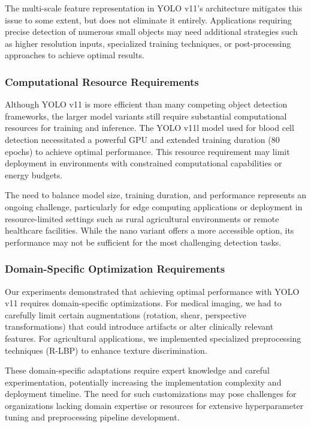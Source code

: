 \begin{multicols}{2}
The multi-scale feature representation in YOLO v11's architecture mitigates this issue to some extent, but does not eliminate it entirely. Applications requiring precise detection of numerous small objects may need additional strategies such as higher resolution inputs, specialized training techniques, or post-processing approaches to achieve optimal results.

\subsubsection{Computational Resource Requirements}
Although YOLO v11 is more efficient than many competing object detection frameworks, the larger model variants still require substantial computational resources for training and inference. The YOLO v11l model used for blood cell detection necessitated a powerful GPU and extended training duration (80 epochs) to achieve optimal performance. This resource requirement may limit deployment in environments with constrained computational capabilities or energy budgets.

The need to balance model size, training duration, and performance represents an ongoing challenge, particularly for edge computing applications or deployment in resource-limited settings such as rural agricultural environments or remote healthcare facilities. While the nano variant offers a more accessible option, its performance may not be sufficient for the most challenging detection tasks.

\subsubsection{Domain-Specific Optimization Requirements}
Our experiments demonstrated that achieving optimal performance with YOLO v11 requires domain-specific optimizations. For medical imaging, we had to carefully limit certain augmentations (rotation, shear, perspective transformations) that could introduce artifacts or alter clinically relevant features. For agricultural applications, we implemented specialized preprocessing techniques (R-LBP) to enhance texture discrimination.

These domain-specific adaptations require expert knowledge and careful experimentation, potentially increasing the implementation complexity and deployment timeline. The need for such customizations may pose challenges for organizations lacking domain expertise or resources for extensive hyperparameter tuning and preprocessing pipeline development.


\end{multicols}
